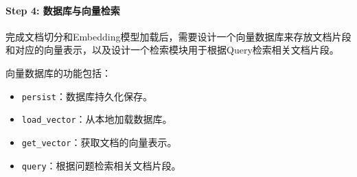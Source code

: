 \documentclass[12pt,a4paper]{book}
\begin{document}
\begin{Shaded}
\begin{Highlighting}[]
\OperatorTok{=}\NormalTok{ chunk\_text[}\OperatorTok{{-}}\NormalTok{]}
\OperatorTok{=}\NormalTok{ prev\_chunk[}\OperatorTok{{-}}\NormalTok{cover\_content:] } \OperatorTok{\textgreater{}}
\OperatorTok{=}\OperatorTok{+} \StringTok{\textquotesingle{}}\StringTok{\textquotesingle{}} \OperatorTok{+}
\OperatorTok{=} \OperatorTok{+}  \OperatorTok{+}
            \NormalTok{:}
\OperatorTok{=}
\OperatorTok{=}


\end{Highlighting}
\end{Shaded}

\paragraph{Step 4:
数据库与向量检索}\label{step-4-ux6570ux636eux5e93ux4e0eux5411ux91cfux68c0ux7d22}

完成文档切分和Embedding模型加载后，需要设计一个向量数据库来存放文档片段和对应的向量表示，以及设计一个检索模块用于根据Query检索相关文档片段。

向量数据库的功能包括：

\begin{itemize}
\tightlist
\item
  \texttt{persist}：数据库持久化保存。
\item
  \texttt{load\_vector}：从本地加载数据库。
\item
  \texttt{get\_vector}：获取文档的向量表示。
\item
  \texttt{query}：根据问题检索相关文档片段。
\end{itemize}
\end{document}
